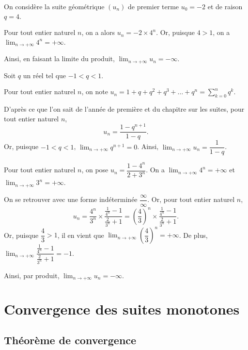 \documentclass[11pt,fleqn, openany]{book} %
\begin{document}
\begin{example} On considère la suite géométrique $(u_n)$ de premier terme $u_0=-2$ et de raison $q=4$.

Pour tout entier naturel $n$, on a alors $u_n=-2 \times 4^n$. Or, puisque $4>1$, on a $\displaystyle \lim _{n\to +\infty} 4^n = +\infty$. 

Ainsi, en faisant la limite du produit, $\displaystyle \lim _{n\to +\infty} u_n = -\infty$.\end{example}

\begin{example} Soit $q$ un réel tel que $-1< q < 1$. 

Pour tout entier naturel $n$, on note $u_n=1+q+q^2+q^3+\ldots + q^n = \displaystyle \sum_{k=0}^n q^k$.

D'après ce que l'on sait de l'année de première et du chapitre sur les suites, pour tout entier naturel $n$, \[u_n=\dfrac{1-q^{n+1}}{1-q}.\]
Or, puisque $-1<q<1$,  $\displaystyle \lim _{n\to +\infty} q^{n+1} = 0$. Ainsi, $\displaystyle \lim _{n\to +\infty} u_n = \dfrac{1}{1-q}$.\end{example}

\begin{example}Pour tout entier naturel $n$, on pose $u_n = \dfrac{1-4^n}{2+3^n}$. On a $\displaystyle \lim _{n\to +\infty} 4^n = +\infty$ et $\displaystyle \lim _{n\to +\infty} 3^n = +\infty$. 

On se retrouver avec une forme indéterminée $\dfrac{\infty}{\infty}$. Or, pour tout entier naturel $n$,
\[u_n = \dfrac{4^n}{3^n} \times \dfrac{\frac{1}{4^n}-1}{\frac{2}{3^n}+1}=\left(\dfrac{4}{3}\right)^n \times \dfrac{\frac{1}{4^n}-1}{\frac{2}{3^n}+1}.\]
Or, puisque $\dfrac{4}{3}>1$, il en vient que $\displaystyle \lim _{n\to +\infty}\left(\dfrac{4}{3}\right)^n=+\infty$. De plus, $\displaystyle \lim _{n\to +\infty}\dfrac{\frac{1}{4^n}-1}{\frac{2}{3^n}+1}=-1$. 

Ainsi, par produit, $\displaystyle \lim _{n\to +\infty}u_n=-\infty$.\end{example}


\newpage

\section{Convergence des suites monotones}

\subsection{Théorème de convergence}
\end{document}
